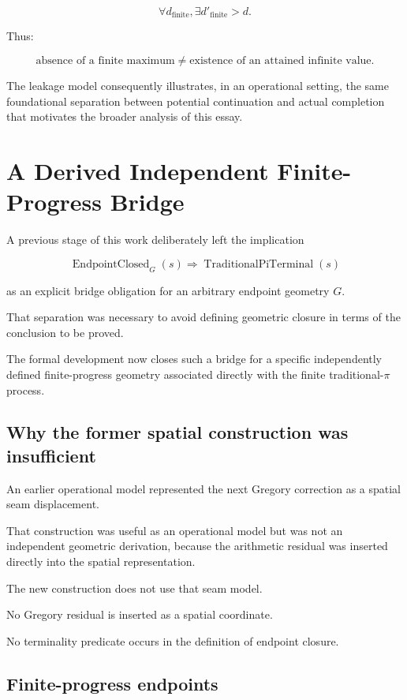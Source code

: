 \documentclass[11pt,a4paper]{article}
\begin{document}
\[
\forall d_{\mathrm{finite}},
\exists d'_{\mathrm{finite}}>d.
\]

Thus:

\[
\boxed{
\text{absence of a finite maximum}
\neq
\text{existence of an attained infinite value}.
}
\]

The leakage model consequently illustrates, in an operational setting,
the same foundational separation between potential continuation and
actual completion that motivates the broader analysis of this essay.




\section{A Derived Independent Finite-Progress Bridge}

A previous stage of this work deliberately left the implication

\[
\operatorname{EndpointClosed}_G(s)
\Longrightarrow
\operatorname{TraditionalPiTerminal}(s)
\]

as an explicit bridge obligation for an arbitrary endpoint geometry
\(G\).

That separation was necessary to avoid defining geometric closure in
terms of the conclusion to be proved.

The formal development now closes such a bridge for a specific
independently defined finite-progress geometry associated directly with
the finite traditional-\(\pi\) process.

\subsection{Why the former spatial construction was insufficient}

An earlier operational model represented the next Gregory correction
as a spatial seam displacement.

That construction was useful as an operational model but was not an
independent geometric derivation, because the arithmetic residual was
inserted directly into the spatial representation.

The new construction does not use that seam model.

No Gregory residual is inserted as a spatial coordinate.

No terminality predicate occurs in the definition of endpoint closure.

\subsection{Finite-progress endpoints}
\end{document}
